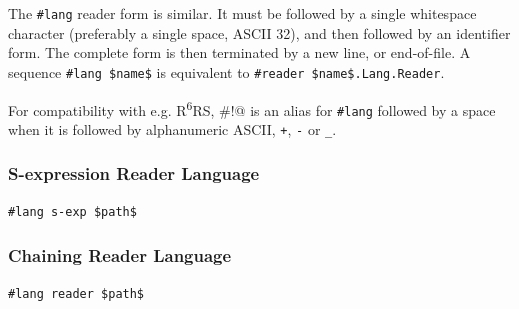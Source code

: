 The \lstinline!#lang! reader form is similar. It must be followed by a single whitespace character (preferably a single space, ASCII 32), and then followed by an identifier form. The complete form is then terminated by a new line, or end-of-file. A sequence \lstinline!#lang $name$! is equivalent to \lstinline!#reader $name$.Lang.Reader!. 


For compatibility with e.g. R\textsuperscript{6}RS, \lstinline@#!@ is an alias for \lstinline!#lang! followed by a space when it is followed by alphanumeric ASCII, \lstinline!+!, \lstinline!-! or \lstinline!_!. 





\subsubsection{S-expression Reader Language}


\begin{lstlisting}
#lang s-exp $path$
\end{lstlisting}





\subsubsection{Chaining Reader Language}


\begin{lstlisting}
#lang reader $path$
\end{lstlisting}






